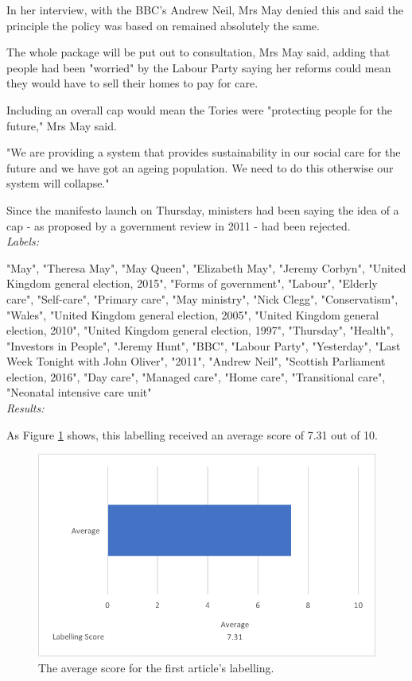 \documentclass[12pt]{article}
\begin{document}
In her interview, with the BBC's Andrew Neil, Mrs May denied this and said the principle the policy was based on remained absolutely the same.

The whole package will be put out to consultation, Mrs May said, adding that people had been "worried" by the Labour Party saying her reforms could mean they would have to sell their homes to pay for care.

Including an overall cap would mean the Tories were "protecting people for the future," Mrs May said.

"We are providing a system that provides sustainability in our social care for the future and we have got an ageing population. We need to do this otherwise our system will collapse."

Since the manifesto launch on Thursday, ministers had been saying the idea of a cap - as proposed by a government review in 2011 - had been rejected. \\


\emph{Labels:}

"May", "Theresa May", "May Queen", "Elizabeth May", "Jeremy Corbyn", "United Kingdom general election, 2015", "Forms of government", "Labour", "Elderly care", "Self-care", "Primary care", "May ministry", "Nick Clegg", "Conservatism", "Wales", "United Kingdom general election, 2005", "United Kingdom general election, 2010", "United Kingdom general election, 1997", "Thursday", "Health", "Investors in People", "Jeremy Hunt", "BBC", "Labour Party", "Yesterday", "Last Week Tonight with John Oliver", "2011", "Andrew Neil", "Scottish Parliament election, 2016", "Day care", "Managed care", "Home care", "Transitional care", "Neonatal intensive care unit" \\

\emph{Results:}

As Figure \ref{label1} shows, this labelling received an average score of 7.31 out of 10.

\begin{figure}[ht!]
  \centering
    \includegraphics[scale=0.7]{label1score.png}
   \caption[The average score for a labelling]{The average score for the first article's labelling.}
   \label{label1}
\end{figure} 
\end{document}
